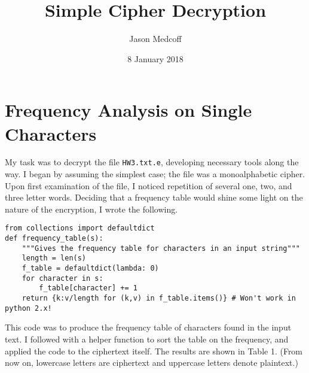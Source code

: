 \documentclass[11pt]{article}
\author{Jason Medcoff}
\date{8 January 2018}
\title{Simple Cipher Decryption}
\begin{document}
\maketitle

\section{Frequency Analysis on Single Characters}
\label{sec-1}

My task was to decrypt the file \verb~HW3.txt.e~, developing necessary tools
along the way. I began by assuming the simplest case; the file was a
monoalphabetic cipher. Upon first examination of the file, I noticed
repetition of several one, two, and three letter words. Deciding that
a frequency table would shine some light on the nature of the
encryption, I wrote the following.

\begin{verbatim}
from collections import defaultdict
def frequency_table(s):
    """Gives the frequency table for characters in an input string"""
    length = len(s)
    f_table = defaultdict(lambda: 0)
    for character in s:
        f_table[character] += 1
    return {k:v/length for (k,v) in f_table.items()} # Won't work in python 2.x!
\end{verbatim}

This code was to produce the frequency table of characters found in
the input text. I followed with a helper function to sort the table on
the frequency, and applied the code to the ciphertext itself. The
results are shown in Table 1. (From now on, lowercase letters are
ciphertext and uppercase letters denote plaintext.)
\end{document}
